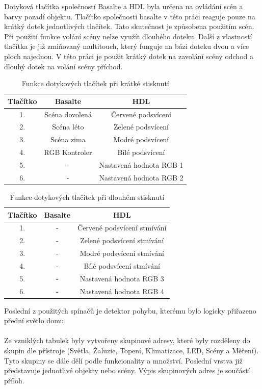 Dotyková tlačítka společností Basalte a HDL byla určena na ovládání scén a barvy pozadí objektu. Tlačítko společnosti basalte v této práci reaguje pouze na  krátký dotek jednotlivých tlačítek. Tato skutečnost je způsobena použitím scén. Při použití funkce volání scény nelze využít dlouhého doteku. Další z vlastností tlačítka je již zmiňovaný multitouch, který funguje na bázi doteku dvou a více ploch najednou. V této práci je použit krátký dotek na zavolání scény odchod a dlouhý dotek na volání scény příchod.
\newpage
\begin{table}[!ht]
 \caption[Funkce dotykových tlačítek při krátké stisknutí]{Funkce dotykových tlačítek při krátké stisknutí}
   \small
    \centering
	  \begin{tabular}{|c|c|c|}
	    \hline
	    Tlačítko & Basalte & HDL \\
	    \hline\hline
	    1. & Scéna dovolená  & Červené podsvícení \\
	    \hline
        2. & Scéna léto  &  Zelené podsvícení \\
	    \hline
        3. & Scéna zima  & Modré podsvícení   \\
	    \hline
        4. & RGB Kontroler & Bílé podsvícení \\
	    \hline
        5. & - & Nastavená hodnota RGB 1 \\
	    \hline 
        6. & - &  Nastavená hodnota RGB 2 \\
	    \hline 
	  \end{tabular}
\end{table}

\begin{table}[!ht]
 \caption[Funkce dotykových tlačítek při dlouhém stisknutí]{Funkce dotykových tlačítek při dlouhém stisknutí}
   \small
    \centering
	  \begin{tabular}{|c|c|c|}
	    \hline
	    Tlačítko & Basalte & HDL  \\
	    \hline\hline
	    1. & - & Červené podsvícení stmívání  \\
	    \hline
        2. & - & Zelené podsvícení stmívání \\
	    \hline
        3. & - & Modré podsvícení stmívání  \\
	    \hline
        4. & - & Bílé podsvícení  stmívání \\
	    \hline
        5. & - & Nastavená hodnota RGB 3 \\
	    \hline 
        6. & - & Nastavená hodnota RGB 4 \\
	    \hline 
	  \end{tabular}
\end{table}

Poslední z použitých spínačů je detektor pohybu, kterému bylo logicky přiřazeno přední světlo domu.\\ \\Ze vzniklých tabulek byly vytvořeny skupinové adresy, které byly rozděleny do skupin dle přístroje (Světla, Žaluzie, Topení, Klimatizace, LED, Scény a Měření). Tyto skupiny se dále dělí podle funkcionality a množství. Poslední vrstva již představuje jednotlivé objekty nebo scény. Výpis skupinových adres je součástí příloh.
